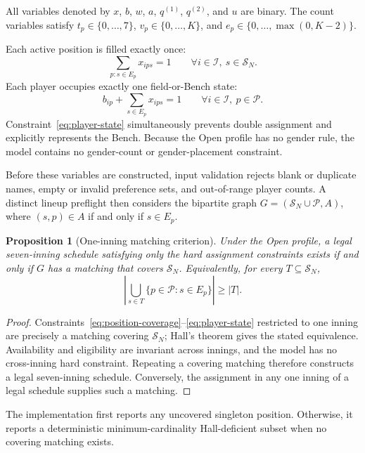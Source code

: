 \documentclass[11pt]{article}
\newtheorem{proposition}{Proposition}
\begin{document}
All variables denoted by $x$, $b$, $w$, $a$, $q^{(1)}$, $q^{(2)}$, and $u$
are binary. The count variables satisfy $t_p\in\{0,\ldots,7\}$,
$v_p\in\{0,\ldots,K\}$, and
$e_p\in\{0,\ldots,\max(0,K-2)\}$.

Each active position is filled exactly once:
\begin{equation}
\sum_{p:s\in E_p}x_{ips}=1
\qquad\forall i\in\mathcal{I},\ s\in\mathcal{S}_N.
\label{eq:position-coverage}
\end{equation}
Each player occupies exactly one field-or-Bench state:
\begin{equation}
b_{ip}+\sum_{s\in E_p}x_{ips}=1
\qquad\forall i\in\mathcal{I},\ p\in\mathcal{P}.
\label{eq:player-state}
\end{equation}
Constraint~\eqref{eq:player-state} simultaneously prevents double assignment and explicitly
represents the Bench. Because the Open profile has no gender rule, the model
contains no gender-count or gender-placement constraint.

Before these variables are constructed, input validation rejects blank or
duplicate names, empty or invalid preference sets, and out-of-range player
counts. A distinct lineup preflight then considers the bipartite graph
$G=(\mathcal S_N\cup\mathcal P,A)$, where $(s,p)\in A$ if and only if
$s\in E_p$.

\begin{proposition}[One-inning matching criterion]
\label{prop:matching}
Under the Open profile, a legal seven-inning schedule satisfying only the hard
assignment constraints exists if and only if $G$ has a matching that covers
$\mathcal S_N$. Equivalently, for every $T\subseteq\mathcal S_N$,
\[
\left|\bigcup_{s\in T}\{p\in\mathcal P:s\in E_p\}\right|\ge |T|.
\]
\end{proposition}
\begin{proof}
Constraints~\eqref{eq:position-coverage}--\eqref{eq:player-state} restricted to
one inning are precisely a matching covering $\mathcal S_N$; Hall's theorem
gives the stated equivalence. Availability and eligibility are invariant across
innings, and the model has no cross-inning hard constraint. Repeating a covering
matching therefore constructs a legal seven-inning schedule. Conversely, the
assignment in any one inning of a legal schedule supplies such a matching.
\end{proof}

The implementation first reports any uncovered singleton position. Otherwise,
it reports a deterministic minimum-cardinality Hall-deficient subset when no
covering matching exists.
\end{document}
